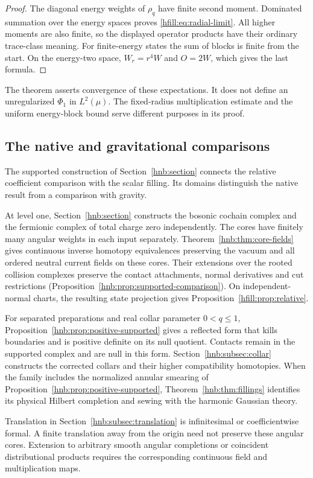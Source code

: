 \begin{proof}
The diagonal energy weights of $\rho_q$ have finite second moment.
Dominated summation over the energy spaces proves
\eqref{hfill:eq:radial-limit}.
All higher moments are also finite, so the displayed operator products
have their ordinary trace-class meaning.
For finite-energy states the sum of blocks is finite from the start.
On the energy-two space, $W_r=r^4W$ and $O=2W$,
which gives the last formula.
\end{proof}

The theorem asserts convergence of these expectations.
It does not define an unregularized $\Phi_1$ in $L^2(\mu)$.
The fixed-radius multiplication estimate and the uniform energy-block
bound serve different purposes in its proof.

\subsection{The native and gravitational comparisons}

The supported construction of Section~\ref{hnb:section} connects the
relative coefficient comparison with the scalar filling.
Its domains distinguish the native result from a comparison with gravity.

\begin{remark}\label{hfill:qn:native}
At level one, Section~\ref{hnb:section} constructs the bosonic cochain
complex and the fermionic complex of total charge zero independently.
The cores have finitely many angular weights in each input separately.
Theorem~\ref{hnb:thm:core-fields} gives continuous inverse homotopy
equivalences preserving the vacuum and all ordered neutral current
fields on these cores. Their extensions over the rooted collision complexes
preserve the contact attachments, normal derivatives and cut
restrictions (Proposition~\ref{hnb:prop:supported-comparison}).
On independent-normal charts, the resulting state projection gives
Proposition~\ref{hfill:prop:relative}.

For separated preparations and real collar parameter $0<q\leq1$,
Proposition~\ref{hnb:prop:positive-supported} gives a reflected form
that kills boundaries and is positive definite on its null quotient.
Contacts remain in the supported complex and are null in this form.
Section~\ref{hnb:subsec:collar} constructs the corrected collars
and their higher compatibility homotopies.
When the family includes the normalized annular smearing of
Proposition~\ref{hnb:prop:positive-supported},
Theorem~\ref{hnb:thm:fillings} identifies its physical Hilbert
completion and sewing with the harmonic Gaussian theory.

Translation in Section~\ref{hnb:subsec:translation} is infinitesimal or
coefficientwise formal. A finite translation away from the origin need
not preserve these angular cores. Extension to arbitrary smooth angular
completions or coincident distributional products requires the
corresponding continuous field and multiplication maps.
\end{remark}

